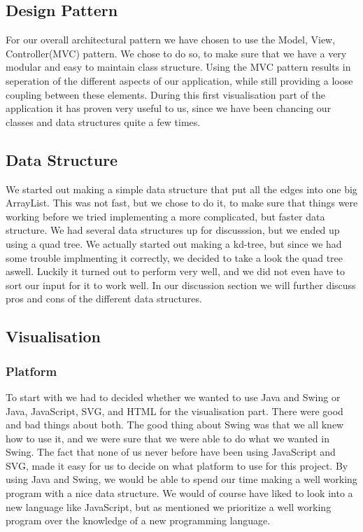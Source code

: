 \documentclass[a4paper,11pt]{article}
\begin{document}
\subsection{Design Pattern} %
\label{sub:Design Pattern}
For our overall architectural pattern we have chosen to use the Model, View, Controller(MVC) pattern. We chose to do so, to make sure that we have
a very modular and easy to maintain class structure. Using the MVC pattern results in seperation of the different aspects of our application, while still providing a loose coupling between these elements. During this first visualisation part of the application it has proven very useful to us, since we
have been chancing our classes and data structures quite a few times.


\subsection{Data Structure} %
\label{sub:Data Structure}
We started out making a simple data structure that put all the edges into one big ArrayList. This was not fast, but we chose to do it, to make sure that
things were working before we tried implementing a more complicated, but faster data structure. We had several data structures up for discusssion, but we ended up using a quad tree. We actually started out making a kd-tree, but since we had some trouble implmenting it correctly, we decided to take a look
the quad tree aswell. Luckily it turned out to perform very well, and we did not even have to sort our input for it to work well. In our discussion 
section we will further discuss pros and cons of the different data structures.

\subsection{Visualisation} %
\label{sub:Visualisation}


\subsubsection{Platform} %
\label{subsub:Platform}
To start with we had to decided whether we wanted to use Java and Swing or Java, JavaScript, SVG, and HTML for the visualisation part. There were good and bad things about both. The good thing about Swing was that we all knew how to use it, and we were sure that we were able to do what we wanted in Swing.
The fact that none of us never before have been using JavaScript and SVG, made it easy for us to decide on what platform to use for this project. By using Java and Swing, we would be able to spend our time making a well working program with a nice data structure. We would of course have liked to look into a new language like JavaScript, but as mentioned we prioritize a well working program over the knowledge of a new programming language.
\end{document}
